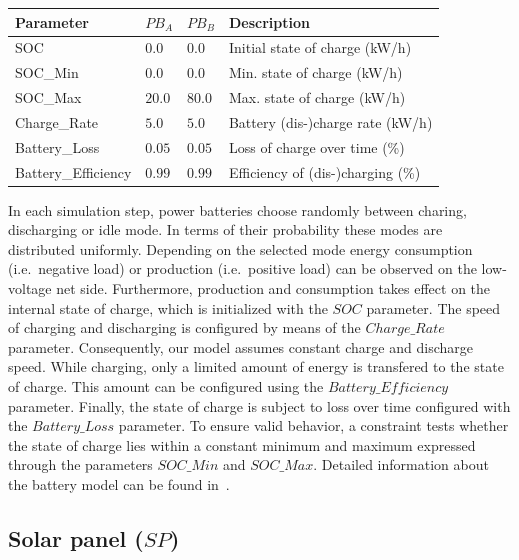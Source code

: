 \begin{table}[h]
	\renewcommand{\arraystretch}{1.3}
	\centering
	\begin{tabularx}{\columnwidth}{lllX}
		\hline
		\textbf{Parameter}     & \textbf{$PB_{A}$} & \textbf{$PB_{B}$} & \textbf{Description} \\ \hline
		SOC                     & $0.0$ & $0.0$ & Initial state of charge (kW/h)                   \\
		SOC\_Min                & $0.0$ & $0.0$ & Min. state of charge (kW/h)                   \\
		SOC\_Max               & $20.0$ & $80.0$ &  Max. state of charge (kW/h)                    \\
		Charge\_Rate            & $5.0$ & $5.0$ & Battery (dis-)charge rate (kW/h)     \\ 
		Battery\_Loss           & $0.05$ & $0.05$ & Loss of charge over time (\%)\\
		Battery\_Efficiency      & $0.99$ & $0.99$ &Efficiency of (dis-)charging (\%)     \\ \hline
	\end{tabularx}
\end{table}

In each simulation step, power batteries choose randomly between charing, discharging or idle mode. In terms of their probability these modes are distributed uniformly. Depending on the selected mode energy consumption (i.e.\ negative load) or production (i.e.\ positive load) can be observed on the low-voltage net side. Furthermore, production and consumption takes effect on the internal state of charge, which is initialized with the $SOC$ parameter. The speed of charging and discharging is configured by means of the $Charge\_Rate$ parameter. Consequently, our model assumes constant charge and discharge speed. While charging, only a limited amount of energy is transfered to the state of charge. This amount can be configured using the $Battery\_Efficiency$ parameter. Finally, the state of charge is subject to loss over time configured with the $Battery\_Loss$ parameter. To ensure valid behavior, a constraint tests whether the state of charge lies within a constant minimum and maximum expressed through the parameters $SOC\_Min$ and $SOC\_Max$. Detailed information about the battery model can be found in~\cite{hackenberg2014rapid}.

\subsection{Solar panel ($SP$)}

